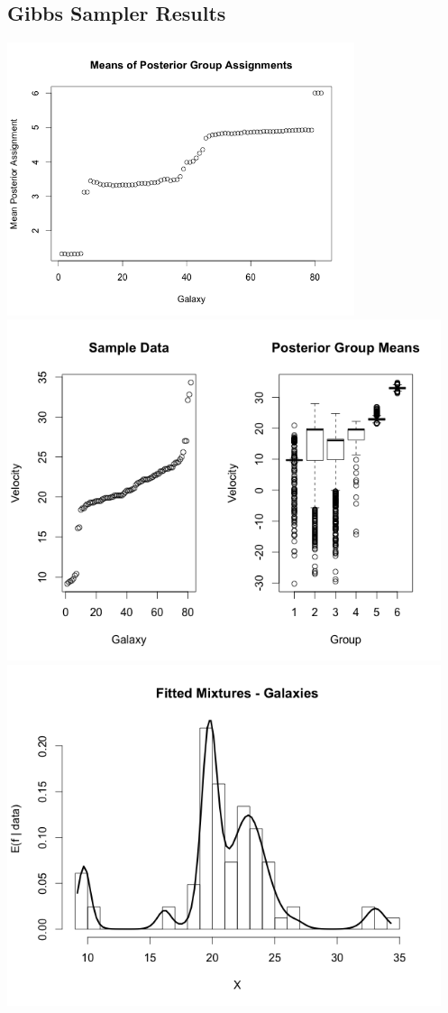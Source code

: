 \documentclass[12pt,letterpaper]{article}\usepackage[]{graphicx}\usepackage[]{color}
\begin{document}
\subsection{Gibbs Sampler Results}
\includegraphics[height=8cm]{gala-posterior-group-assignments.png}\\
\includegraphics[height=10cm]{gala-sampledata-posteriormeans.png}\\
\includegraphics[height=10cm, keepaspectratio]{gala-fitted-mixtures.png}\\
\end{document}

